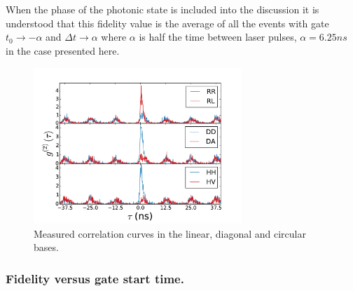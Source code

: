 \documentclass[12pt, twoside]{article}
\numberwithin{equation}{section}
\begin{document}
When the phase of the photonic state is included into the discussion it
is understood that this fidelity value is the average of all the events
with gate $t_0 \to -\alpha$ and $\Delta t \to \alpha$ where $\alpha$ is
half the time between laser pulses, $\alpha = 6.25 ns$ in the case
presented here.

\begin{figure}[h!]
    \centering
    \includegraphics[width=0.7\textwidth]{notebooks/correlations.pdf}
    \caption{Measured correlation curves in the linear, diagonal and circular bases.}
    \label{fig:correlationsdata}
\end{figure}

\subsubsection{Fidelity versus gate start
time.}\label{fidelity-versus-gate-start-time.}
\end{document}
